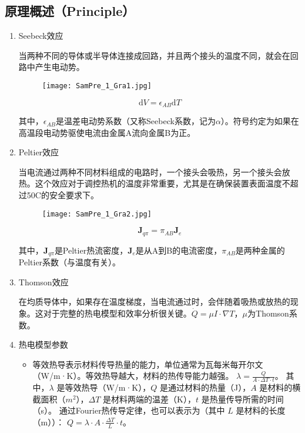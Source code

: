 \documentclass[dvipsnames, svgnames,a4paper,11pt]{article}
\begin{document}
	\subsection{原理概述（Principle）}
	\begin{enumerate}
		\item Seebeck效应
		
		当两种不同的导体或半导体连接成回路，并且两个接头的温度不同，就会在回路中产生电动势。
		
		\begin{figure}[htbp]
			\centering
			\texttt{[image: SamPre\_1\_Gra1.jpg]}
		\end{figure}
		
		$$\mathrm{d}V=\epsilon_{AB}\mathrm{d}T$$
			
		其中，$\epsilon_{AB}$是温差电动势系数（又称Seebeck系数，记为$\alpha$）。符号约定为如果在高温段电动势驱使电流由金属A流向金属B为正。	
		
		\item Peltier效应
		
		当电流通过两种不同材料组成的电路时，一个接头会吸热，另一个接头会放热。这个效应对于调控热机的温度非常重要，尤其是在确保装置表面温度不超过50\degree C的安全要求下。
		
		\begin{figure}[htbp]
			\centering
			\texttt{[image: SamPre\_1\_Gra2.jpg]}
		\end{figure}
		
		$$\textbf{J}_{q\pi}=\pi_{AB}\textbf{J}_{e}$$
		
		其中，$\textbf{J}_{q\pi}$是Peltier热流密度，$\textbf{J}_{e}$是从A到B的电流密度，$\pi_{AB}$是两种金属的Peltier系数（与温度有关）。
		
		\item Thomson效应
		
		在均质导体中，如果存在温度梯度，当电流通过时，会伴随着吸热或放热的现象。这对于完整的热电模型和效率分析很关键。$\dot{Q}=\mu I\cdot \nabla T$，$\mu$为Thomson系数。
		
		\item 热电模型参数
		
		\begin{itemize}
			\item 等效热导表示材料传导热量的能力，单位通常为瓦每米每开尔文（W/m·K）。等效热导越大，材料的热传导能力越强。
			$
			\lambda = \frac{Q}{A \cdot \Delta T \cdot t}
			$。
			其中，$\lambda$ 是等效热导（W/m·K），$Q$ 是通过材料的热量（J），$A$ 是材料的横截面积（$m^2$），$\Delta T$ 是材料两端的温差（K），$t$ 是热量传导所需的时间（s）。
			通过Fourier热传导定律，也可以表示为（其中 $L$ 是材料的长度（m））：
			$
			Q = \lambda \cdot A \cdot \frac{\Delta T}{L} \cdot t
			$。
			

\end{itemize}
\end{enumerate}
\end{document}
